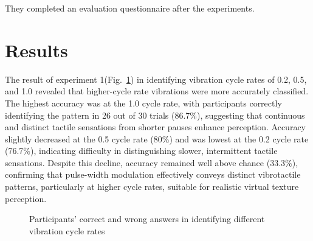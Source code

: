 \documentclass[a4paper,twocolumn]{article}
\begin{document}
They completed an evaluation questionnaire after the experiments. 					

\section{Results}

The result of experiment 1(Fig.~\ref{fig:C_W_ex1}) in identifying vibration cycle rates of 0.2, 0.5, and 1.0 revealed that higher-cycle rate vibrations were more accurately classified. The highest accuracy was at the 1.0 cycle rate, with participants correctly identifying the pattern in 26 out of 30 trials (86.7\%), suggesting that continuous and distinct tactile sensations from shorter pauses enhance perception. Accuracy slightly decreased at the 0.5 cycle rate (80\%) and was lowest at the 0.2 cycle rate (76.7\%), indicating difficulty in distinguishing slower, intermittent tactile sensations. Despite this decline, accuracy remained well above chance (33.3\%), confirming that pulse-width modulation effectively conveys distinct vibrotactile patterns, particularly at higher cycle rates, suitable for realistic virtual texture perception.


% 	

\begin{figure}[H]\centering
	
	\caption{Participants' correct and wrong answers in identifying different vibration cycle rates}\label{fig:C_W_ex1}
\end{figure}
\end{document}

